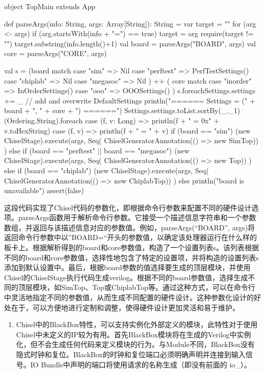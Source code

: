 \begin{CodeBlock}[language=BookScala]
object TopMain extends App {
  def parseArgs(info: String, args: Array[String]): String = {
    var target = ""
    for (arg <- args) { if (arg.startsWith(info + "=") == true) { target = arg } }
    require(target != "")
    target.substring(info.length()+1)
  }
  val board = parseArgs("BOARD", args)
  val core = parseArgs("CORE", args)
  
  val s = (board match {
    case "sim"    => Nil
    case "perftest" => PerfTestSettings()
    case "chiplab" => Nil
    case "megasoc" => Nil
  } ) ++ ( core match {
    case "inorder"  => InOrderSettings()
    case "ooo"  => OOOSettings()
  } )
  s.foreach{Settings.settings += _} // add and overwrite DefaultSettings
  println("====== Settings = (" + board + ", " +  core + ") ======")
  Settings.settings.toList.sortBy(_._1)(Ordering.String).foreach {
    case (f, v: Long) =>
      println(f + " = 0x" + v.toHexString)
    case (f, v) =>
      println(f + " = " + v)
  }
  if (board == "sim") {
    (new ChiselStage).execute(args, Seq(
      ChiselGeneratorAnnotation(() => new SimTop))
    )
  } else if (board == "perftest" || board == "megasoc") {
    (new ChiselStage).execute(args, Seq(
      ChiselGeneratorAnnotation(() => new Top))
    )
  } else if (board == "chiplab") {
    (new ChiselStage).execute(args, Seq(
      ChiselGeneratorAnnotation(() => new ChiplabTop))
    )
  } else {
    println("board is unavailable")
    assert(false)
  }
}
\end{CodeBlock}

这段代码实现了Chisel代码的参数化，即根据命令行参数来配置不同的硬件设计选项。parseArgs函数用于解析命令行参数。它接受一个描述信息字符串和一个参数数组，并返回与该描述信息对应的参数值。例如，parseArgs(``BOARD'', args)将返回命令行参数中以''BOARD=``开头的参数值，以确定该处理器运行在什么样的板卡上。根据解析得到的board和core参数值，构造了一个设置列表s。该列表根据不同的board和core参数值，选择性地包含了特定的设置项，并将构造的设置列表s添加到默认设置中。最后，根据board参数的值选择要生成的顶层模块，并使用Chisel的ChiselStage执行代码生成verilog。根据不同的board参数值，选择生成不同的顶层模块，如SimTop、Top或ChiplabTop等。通过这种方式，可以在命令行中灵活地指定不同的参数值，从而生成不同配置的硬件设计。这种参数化设计的好处在于，可以方便地进行定制和调整，使得硬件设计更加灵活和易于维护。

\begin{enumerate}
\def\labelenumi{\arabic{enumi}.}
\setcounter{enumi}{1}
\tightlist
\item
  Chisel中的BlackBox特性，可以支持实例化外部定义的模块，此特性对于使用Chisel中未定义的IP较为有用。首先BlackBox模块将在生成的Verilog中实例化，但不会生成任何代码来定义模块的行为。与Module不同，BlackBox没有隐式时钟和复位。BlackBox的时钟和复位端口必须明确声明并连接到输入信号。IO Bundle中声明的端口将使用请求的名称生成（即没有前面的 io\_）。
\end{enumerate}

